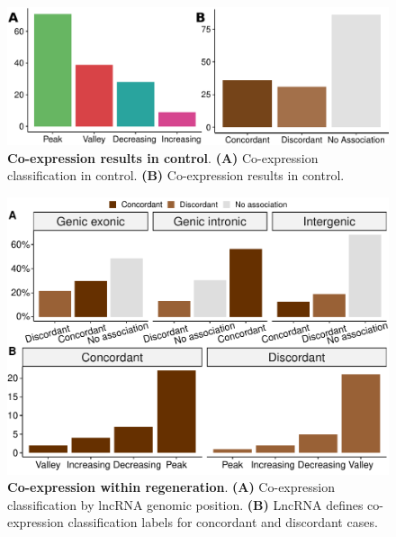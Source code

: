 \begin{figure}[ht!]
  \centering
  \includegraphics[scale=0.6]{plots/appendix/dme/co.expression.ctrl.pdf}
  \caption[Co-expression results in control]{\textbf{Co-expression results in control}. \textbf{(A)} Co-expression classification in control. \textbf{(B)} Co-expression results in control.}
  \label{supp-fig:co-exp-ctrl}
\end{figure}

\begin{figure}[ht!]
  \centering
  \includegraphics[scale=0.6]{plots/appendix/dme/co.expression.within.reg.pdf}
  \caption[Co-expression within regeneration]{\textbf{Co-expression within regeneration}. \textbf{(A)} Co-expression classification by lncRNA genomic position. \textbf{(B)} LncRNA defines co-expression classification labels for concordant and discordant cases.}
  \label{fig:co-exp-supp-fig}
\end{figure}

